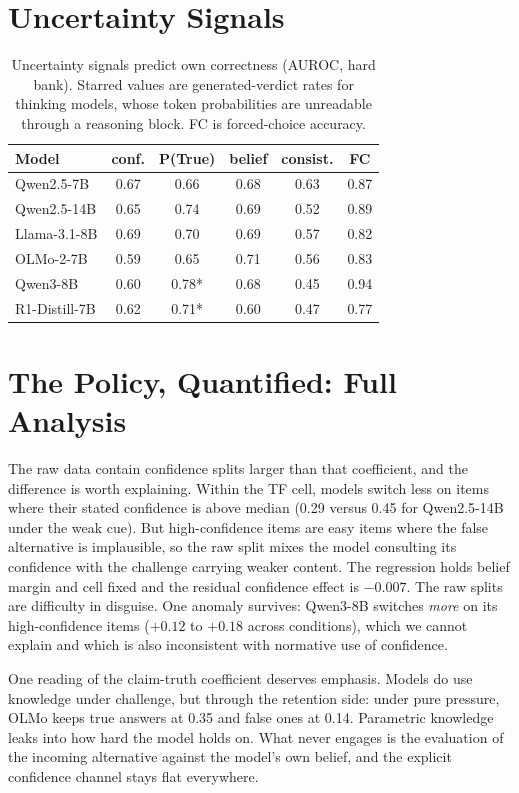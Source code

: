 \documentclass{article}
\begin{document}
\section{Uncertainty Signals}
\label{app:signals}
\begin{table}[t]
\caption{Uncertainty signals predict own correctness (AUROC, hard bank). Starred values are generated-verdict rates for thinking models, whose token probabilities are unreadable through a reasoning block. FC is forced-choice accuracy.}
\label{tab:signals}
\vskip 0.1in
\centering
\small
\begin{tabular}{lccccc}
\toprule
Model & conf. & P(True) & belief & consist. & FC \\
\midrule
Qwen2.5-7B & 0.67 & 0.66 & 0.68 & 0.63 & 0.87 \\
Qwen2.5-14B & 0.65 & 0.74 & 0.69 & 0.52 & 0.89 \\
Llama-3.1-8B & 0.69 & 0.70 & 0.69 & 0.57 & 0.82 \\
OLMo-2-7B & 0.59 & 0.65 & 0.71 & 0.56 & 0.83 \\
Qwen3-8B & 0.60 & 0.78* & 0.68 & 0.45 & 0.94 \\
R1-Distill-7B & 0.62 & 0.71* & 0.60 & 0.47 & 0.77 \\
\bottomrule
\end{tabular}
\vskip -0.1in
\end{table}
\section{The Policy, Quantified: Full Analysis}
\label{app:quant}
The raw data contain confidence splits larger than that coefficient, and the difference is worth explaining. Within the TF cell, models switch less on items where their stated confidence is above median (0.29 versus 0.45 for Qwen2.5-14B under the weak cue). But high-confidence items are easy items where the false alternative is implausible, so the raw split mixes the model consulting its confidence with the challenge carrying weaker content. The regression holds belief margin and cell fixed and the residual confidence effect is $-0.007$. The raw splits are difficulty in disguise. One anomaly survives: Qwen3-8B switches \emph{more} on its high-confidence items ($+0.12$ to $+0.18$ across conditions), which we cannot explain and which is also inconsistent with normative use of confidence.

One reading of the claim-truth coefficient deserves emphasis. Models do use knowledge under challenge, but through the retention side: under pure pressure, OLMo keeps true answers at 0.35 and false ones at 0.14. Parametric knowledge leaks into how hard the model holds on. What never engages is the evaluation of the incoming alternative against the model's own belief, and the explicit confidence channel stays flat everywhere.
\end{document}

